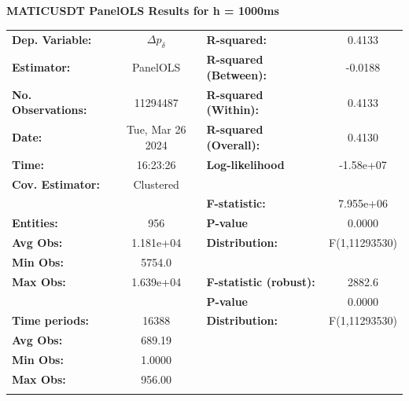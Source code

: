 \documentclass[a4paper, oneside, notitlepage]{book}
\begin{document}
\begin{table}
\textbf{MATICUSDT PanelOLS Results for h = 1000ms}
\begin{center}
\begin{tabular}{lclc}
\hline
\textbf{Dep. Variable:}    &         $\Delta p_{\delta}$         & \textbf{  R-squared:         }   &      0.4133      \\
\textbf{Estimator:}        &      PanelOLS      & \textbf{  R-squared (Between):}  &     -0.0188      \\
\textbf{No. Observations:} &      11294487      & \textbf{  R-squared (Within):}   &      0.4133      \\
\textbf{Date:}             &  Tue, Mar 26 2024  & \textbf{  R-squared (Overall):}  &      0.4130      \\
\textbf{Time:}             &      16:23:26      & \textbf{  Log-likelihood     }   &    -1.58e+07     \\
\textbf{Cov. Estimator:}   &     Clustered      & \textbf{                     }   &                  \\
\textbf{}                  &                    & \textbf{  F-statistic:       }   &    7.955e+06     \\
\textbf{Entities:}         &        956         & \textbf{  P-value            }   &      0.0000      \\
\textbf{Avg Obs:}          &     1.181e+04      & \textbf{  Distribution:      }   &  F(1,11293530)   \\
\textbf{Min Obs:}          &       5754.0       & \textbf{                     }   &                  \\
\textbf{Max Obs:}          &     1.639e+04      & \textbf{  F-statistic (robust):} &      2882.6      \\
\textbf{}                  &                    & \textbf{  P-value            }   &      0.0000      \\
\textbf{Time periods:}     &       16388        & \textbf{  Distribution:      }   &  F(1,11293530)   \\
\textbf{Avg Obs:}          &       689.19       & \textbf{                     }   &                  \\
\textbf{Min Obs:}          &       1.0000       & \textbf{                     }   &                  \\
\textbf{Max Obs:}          &       956.00       & \textbf{                     }   &                  \\
\textbf{}                  &                    & \textbf{                     }   &                  \\

\end{tabular}
\end{center}
\end{table}
\end{document}
